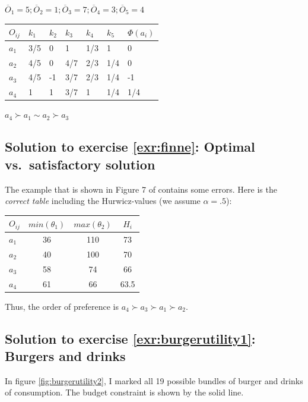 \documentclass[
  12pt,
  oneside]{book}
\theoremstyle{definition}
\theoremstyle{definition}
\theoremstyle{definition}
\theoremstyle{definition}
\theoremstyle{remark}
\begin{document}
\(\overline{O}_1=5; \overline{O}_2=1; \overline{O}_3=7; \overline{O}_4=3; \overline{O}_5=4\)

\begin{longtable}[]{@{}lllllll@{}}
\toprule\noalign{}
\(O_{ij}\) & \(k_1\) & \(k_2\) & \(k_3\) & \(k_4\) & \(k_5\) & \(\Phi(a_i)\) \\
\midrule\noalign{}
\endhead
\bottomrule\noalign{}
\endlastfoot
\(a_1\) & 3/5 & 0 & 1 & 1/3 & 1 & 0 \\
\(a_2\) & 4/5 & 0 & 4/7 & 2/3 & 1/4 & 0 \\
\(a_3\) & 4/5 & -1 & 3/7 & 2/3 & 1/4 & -1 \\
\(a_4\) & 1 & 1 & 3/7 & 1 & 1/4 & 1/4 \\
\end{longtable}

\(a_4\succ a_1 \sim a_2 \succ a_3\)

\subsection*{Solution to exercise \ref{exr:finne}: Optimal vs.~satisfactory solution}\label{sol:finne}

The example that is shown in Figure 7 of \citet[p.~401]{Finne1998three} contains some errors. Here is the \emph{correct table} including the Hurwicz-values (we assume \(\alpha=.5\)):

\begin{longtable}[]{@{}lccc@{}}
\toprule\noalign{}
\(O_{ij}\) & \(min(\theta_1)\) & \(max(\theta_2)\) & \(H_i\) \\
\midrule\noalign{}
\endhead
\bottomrule\noalign{}
\endlastfoot
\(a_1\) & 36 & 110 & 73 \\
\(a_2\) & 40 & 100 & 70 \\
\(a_3\) & 58 & 74 & 66 \\
\(a_4\) & 61 & 66 & 63.5 \\
\end{longtable}

Thus, the order of preference is \(a_4\succ a_3 \succ a_1 \succ a_2\).

\subsection*{Solution to exercise \ref{exr:burgerutility1}: Burgers and drinks}\label{sol:burgerutility1}

In figure \ref{fig:burgerutility2}, I marked all 19 possible bundles of burger and drinks of consumption. The budget constraint is shown by the solid line.
\end{document}
